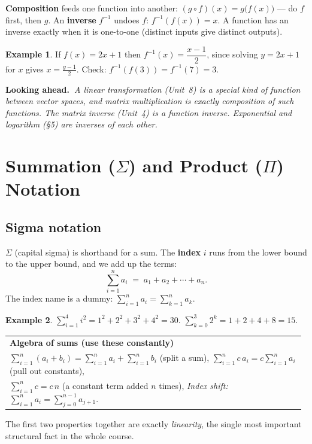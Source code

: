 \documentclass[11pt]{article}
\makeatletter
\theoremstyle{definition}
\newtheorem{example}{Example}[section]
\newcommand{\keybox}[2]{%
  \par\smallskip\noindent
  \begin{tabular}{@{}p{0.985\linewidth}@{}}
  \arrayrulecolor{RoyalBlue}\toprule
  {\sffamily\bfseries\color{RoyalBlue}#1}\\[2pt]#2\\
  \bottomrule
  \end{tabular}\par\smallskip}
\newcommand{\lookahead}[1]{%
  \par\smallskip\noindent
  {\sffamily\bfseries\color{BrickRed}Looking ahead.~}\textit{#1}\par\smallskip}
\newcommand{\ds}{\displaystyle}
\makeatother
\begin{document}
\textbf{Composition} feeds one function into another:
$(g\circ f)(x)=g\bigl(f(x)\bigr)$ --- do $f$ first, then $g$. An \textbf{inverse}
$f^{-1}$ undoes $f$: $f^{-1}(f(x))=x$. A function has an inverse exactly when it
is one-to-one (distinct inputs give distinct outputs).

\begin{example}
If $f(x)=2x+1$ then $f^{-1}(x)=\dfrac{x-1}{2}$, since solving $y=2x+1$ for $x$
gives $x=\frac{y-1}{2}$. Check: $f^{-1}(f(3))=f^{-1}(7)=3$. \checkmark
\end{example}

\lookahead{A \emph{linear transformation} (Unit~8) is a special kind of function
between vector spaces, and matrix multiplication is exactly \emph{composition} of
such functions. The matrix inverse (Unit~4) is a function inverse. Exponential
and logarithm (\S5) are inverses of each other.}

\section{Summation ($\Sigma$) and Product ($\Pi$) Notation}

\subsection{Sigma notation}
$\Sigma$ (capital sigma) is shorthand for a sum. The \textbf{index} $i$ runs from
the lower bound to the upper bound, and we add up the terms:
\[
\sum_{i=1}^{n} a_i \;=\; a_1+a_2+\cdots+a_n .
\]
The index name is a dummy: $\sum_{i=1}^{n}a_i=\sum_{k=1}^{n}a_k$.

\begin{example}
$\ds\sum_{i=1}^{4} i^2 = 1^2+2^2+3^2+4^2 = 30.$ \qquad
$\ds\sum_{k=0}^{3} 2^k = 1+2+4+8 = 15.$
\end{example}

\keybox{Algebra of sums (use these constantly)}{%
$\ds\sum_{i=1}^{n}(a_i+b_i)=\sum_{i=1}^{n}a_i+\sum_{i=1}^{n}b_i$ \quad(split a sum),\qquad
$\ds\sum_{i=1}^{n} c\,a_i = c\sum_{i=1}^{n}a_i$ \quad(pull out constants),\\[4pt]
$\ds\sum_{i=1}^{n} c = c\,n$ \quad(a constant term added $n$ times),\qquad
\emph{Index shift:} $\ds\sum_{i=1}^{n} a_i = \sum_{j=0}^{n-1} a_{j+1}$.}

The first two properties together are exactly \emph{linearity}, the single most
important structural fact in the whole course.
\end{document}
